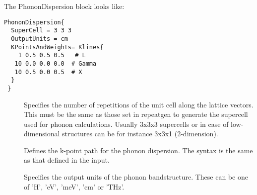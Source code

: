 The PhononDispersion block looks like:

\begin{verbatim}
PhononDispersion{
  SuperCell = 3 3 3
  OutputUnits = cm
  KPointsAndWeights= Klines{
    1 0.5 0.5 0.5   # L
   10 0.0 0.0 0.0  # Gamma 
   10 0.5 0.0 0.5  # X
  }
 }
\end{verbatim}

\begin{description}
\item[] Specifies the number of repetitions of the unit cell along
	the lattice vectors.
	This must be the same as those set in repeatgen to generate the supercell
	used for phonon calculations. Usually 3x3x3 supercells or in case of 
	low-dimensional structures can be for instance 3x3x1 (2-dimension). 
\item[] Defines the k-point path for the phonon dispersion. 
	The syntax is the same as that defined in the \dftbp{} input. 
\item[] Specifies the output units of the phonon bandstructure. 
	These can be one of 'H', 'eV', 'meV', 'cm' or 'THz'. 
\end{description} 


